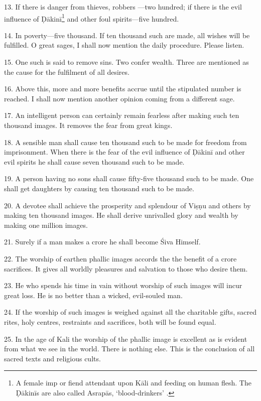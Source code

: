 13. If there is danger from thieves, robbers \etc—two hundred; if there is
the evil influence of Ḍākinī\footnote{A female imp or fiend attendant upon Kāli
and feeding on human flesh. The Ḍākinīs are also called Asrapās, ‘blood-drinkers’
.} and other foul spirits—five hundred.

14. In poverty—five thousand. If ten thousand such are made, all wishes will be
fulfilled. O great sages, I shall now mention the daily procedure. Please listen.

15. One such is said to remove sins. Two confer wealth. Three are mentioned as
the cause for the fulfilment of all desires.

16. Above this, more and more benefits accrue until the stipulated number is
reached. I shall now mention another opinion coming from a different sage.

17. An intelligent person can certainly remain fearless after making such ten
thousand images. It removes the fear from great kings.

18. A sensible man shall cause ten thousand such to be made for freedom from
imprisonment. When there is the fear of the evil influence of Ḍākinī and other
evil spirits he shall cause seven thousand such to be made.

19. A person having no sons shall cause fifty-five thousand such to be made. One
shall get daughters by causing ten thousand such to be made.

20. A devotee shall achieve the prosperity and splendour of Viṣṇu and others by
making ten thousand images. He shall derive unrivalled glory and wealth by
making one million images.

21. Surely if a man makes a crore he shall become Śiva Himself.

22. The worship of earthen phallic images accords the the benefit of a crore
sacrifices. It gives all worldly pleasures and salvation to those who desire
them.

23. He who spends his time in vain without worship of such images will incur
great loss. He is no better than a wicked, evil-souled man.

24. If the worship of such images is weighed against all the charitable gifts,
sacred rites, holy centres, restraints and sacrifices, both will be found equal.

25. In the age of Kali the worship of the phallic image is excellent as is
evident from what we see in the world. There is nothing else. This is
the conclusion of all sacred texts and religious cults.

